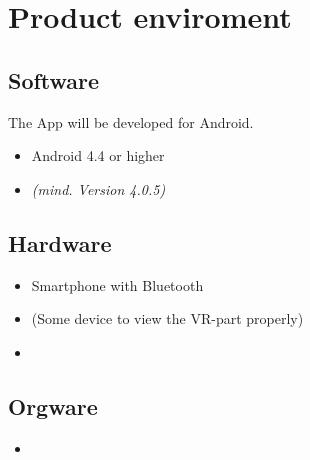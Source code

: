 \section{Product enviroment}


\subsection{Software}

The App will be developed for Android.

  \begin{itemize}
    \item Android 4.4 or higher
    
    \item \textbf{} \textit{(mind. Version 4.0.5)}
  \end{itemize}

\subsection{Hardware}

  \begin{itemize}
    \item Smartphone with Bluetooth
    \item (Some device to view the VR-part properly)
    \item
  \end{itemize}

\subsection{Orgware}

\begin{itemize}
  \item
\end{itemize}
